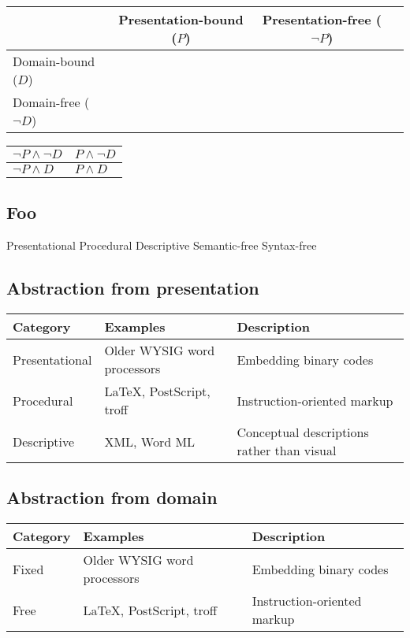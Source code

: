 \documentclass{scrreprt}
\begin{document}
\begin{tabular}{ l | c | c | c }
    & Presentation-bound (\(P\)) & Presentation-free (\(\neg P \))
    \\ \hline

    Domain-bound (\(D\)) 
    \\ \hline

    Domain-free (\(\neg D\))
\end{tabular}

\begin{tabular}{ l | l }
    \(\neg P \wedge \neg D\) &
    \(P \wedge \neg D\) \\
    \hline
    \(\neg P \wedge D\) &
    \(P \wedge D\)
\end{tabular}

\subsection{Foo}
Presentational
Procedural
Descriptive
Semantic-free
Syntax-free


\subsection{Abstraction from presentation}

\begin{tabular}{ l | l | l }
  \textbf{Category} &
  \textbf{Examples} &
  \textbf{Description}
  \\ \hline

  Presentational
  & Older WYSIG word processors
  & Embedding binary codes
  \\


  Procedural
  & \LaTeX, PostScript, troff
  & Instruction-oriented markup
  \\


  Descriptive
  & XML, Word ML
  & Conceptual descriptions rather than visual
  \\
\end{tabular}


\subsection{Abstraction from domain}

\begin{tabular}{ l | l | l }
  \textbf{Category} &
  \textbf{Examples} &
  \textbf{Description}
  \\ \hline

  Fixed
  & Older WYSIG word processors
  & Embedding binary codes
  \\


  Free
  & \LaTeX, PostScript, troff
  & Instruction-oriented markup
  \\

\end{tabular}
\end{document}

